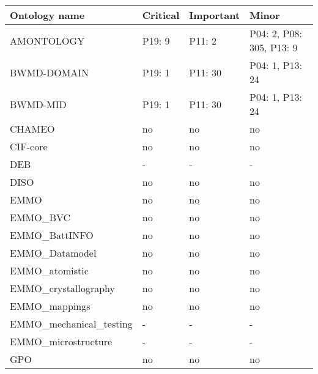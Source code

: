 \begin{tabular}{m{5cm}m{3cm}m{3cm}m{3cm}}
\toprule
          Ontology name &       Critical &       Important &                                    Minor \\
\midrule
             AMONTOLOGY &         P19: 9 &          P11: 2 &                 P04: 2, P08: 305, P13: 9 \\
            BWMD-DOMAIN &         P19: 1 &         P11: 30 &                          P04: 1, P13: 24 \\
               BWMD-MID &         P19: 1 &         P11: 30 &                          P04: 1, P13: 24 \\
                 CHAMEO &             no &              no &                                       no \\
               CIF-core &             no &              no &                                       no \\
                    DEB &              - &               - &                                        - \\
                   DISO &             no &              no &                                       no \\
                   EMMO &             no &              no &                                       no \\
               EMMO_BVC &             no &              no &                                       no \\
          EMMO_BattINFO &             no &              no &                                       no \\
         EMMO_Datamodel &             no &              no &                                       no \\
         EMMO_atomistic &             no &              no &                                       no \\
   EMMO_crystallography &             no &              no &                                       no \\
          EMMO_mappings &             no &              no &                                       no \\
EMMO_mechanical_testing &              - &               - &                                        - \\
    EMMO_microstructure &              - &               - &                                        - \\
                    GPO &             no &              no &                                       no \\

\end{tabular}
